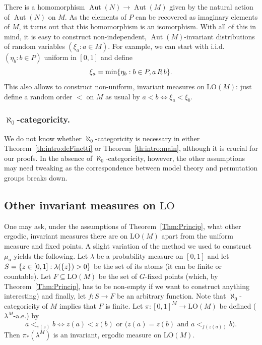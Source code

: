 \documentclass[11pt]{article}
\providecommand{\And}{}\numberwithin{equation}{section}
\let\sub\subseteq
\theoremstyle{plain}
\theoremstyle{definition}
\DeclareMathOperator{\Aut}{Aut}
\DeclarePairedDelimiter\set{\{}{\}}
\newcommand{\LO}{\mathrm{LO}}
\newcommand{\muu}{\mu_{\mathrm{u}}}
\renewcommand{\And}{\text{ and }}
\newcommand{\Or}{\text{ or }}
\newcommand{\eqrel}[1]{\,#1\,}
\begin{document}
There is a homomorphism $\Aut(N) \to \Aut(M)$ given by the natural action of $\Aut(N)$ on $M$. As the elements of $P$ can be recovered as imaginary elements of $M$, it turns out that this homomorphism is an isomorphism. With all of this in mind, it is easy to construct non-independent, $\Aut(M)$-invariant distributions of random variables $(\xi_a : a \in M)$. For example, we can start with i.i.d. $(\eta_b : b \in P)$ uniform in $[0, 1]$ and define
\begin{equation*}
\xi_a = \min \set{\eta_b : b \in P, a \eqrel{R} b}.
\end{equation*}
This also allows to construct non-uniform, invariant measures on $\LO(M)$: just define a random order $<$ on $M$ as usual by $a < b \iff \xi_a < \xi_b$.

\subsubsection*{$\aleph_0$-categoricity.} We do not know whether $\aleph_0$-categoricity is necessary in either Theorem~\ref{th:intro:deFinetti} or Theorem~\ref{th:intro:main}, although it is crucial for our proofs. In the absence of $\aleph_0$-categoricity, however, the other assumptions may need tweaking as the correspondence between model theory and permutation groups breaks down.

\subsection{Other invariant measures on $\LO$}
\label{sec:other-invar-meas}

One may ask, under the assumptions of Theorem~\ref{Thm:Princip}, what other ergodic, invariant measures there are on $\LO(M)$ apart from the uniform measure and fixed points. A slight variation of the method we used to construct $\muu$ yields the following. Let $\lambda$ be a probability measure on $[0, 1]$ and let $S = \set{z \in [0, 1] : \lambda(\set{z}) > 0}$ be the set of its atoms (it can be finite or countable). Let $F \sub \LO(M)$ be the set of $G$-fixed points (which, by Theorem~\ref{Thm:Princip}, has to be non-empty if we want to construct anything interesting) and finally, let $f \colon S \to F$ be an arbitrary function. Note that $\aleph_0$-categoricity of $M$ implies that $F$ is finite. Let $\pi \colon [0, 1]^M \to \LO(M)$ be defined ($\lambda^M$-a.e.) by
\begin{equation*}
a <_{\pi(z)} b \iff z(a) < z(b) \Or \big( z(a) = z(b) \And a <_{f(z(a))} b \big).
\end{equation*}
Then $\pi_*(\lambda^M)$ is an invariant, ergodic measure on $\LO(M)$.
\end{document}
